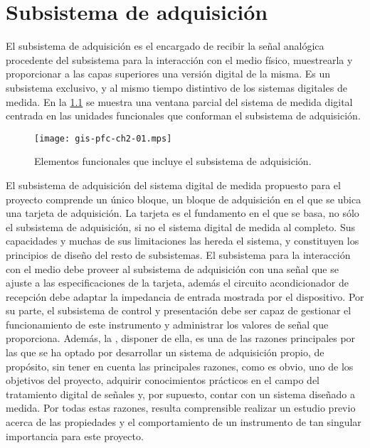 \chapter{Subsistema de adquisición}\label{chap:acquisition}

El subsistema de adquisición es el encargado de recibir la señal analógica
procedente del subsistema para la interacción con el medio físico,
muestrearla y proporcionar a las capas superiores una versión digital de la
misma. Es un subsistema exclusivo, y al mismo tiempo distintivo de los
sistemas digitales de medida. En la \cref{fig:subacqui} se muestra una
ventana parcial del sistema de medida digital centrada en las unidades
funcionales que conforman el subsistema de adquisición.

\begin{figure}
	\begin{center}
		\texttt{[image: gis-pfc-ch2-01.mps]}
	\end{center}
	\caption[Subsistema de adquisición] {Elementos funcionales que
	incluye el subsistema de adquisición.}
	\label{fig:subacqui}
\end{figure}

El subsistema de adquisición del sistema digital de medida propuesto para
el proyecto comprende un único bloque, un bloque de adquisición en el que
se ubica una tarjeta de adquisición. La tarjeta \kpci{} es el fundamento en
el que se basa, no sólo el subsistema de adquisición, si no el sistema
digital de medida al completo. Sus capacidades y muchas de sus limitaciones
las hereda el sistema, y constituyen los principios de diseño del resto de
subsistemas. El subsistema para la interacción con el medio debe proveer al
subsistema de adquisición con una señal que se ajuste a las
especificaciones de la tarjeta, además el circuito acondicionador de
recepción debe adaptar la impedancia de entrada mostrada por el
dispositivo. Por su parte, el subsistema de control y presentación debe ser
capaz de gestionar el funcionamiento de este instrumento y administrar los
valores de señal que proporciona. Además, la \kpci{}, disponer de ella, es
una de las razones principales por las que se ha optado por desarrollar un
sistema de adquisición propio, de propósito, sin tener en cuenta las
principales razones, como es obvio, uno de los objetivos del proyecto,
adquirir conocimientos prácticos en el campo del tratamiento digital de
señales y, por supuesto, contar con un sistema diseñado a medida. Por todas
estas razones, resulta comprensible realizar un estudio previo acerca de
las propiedades y el comportamiento de un instrumento de tan singular
importancia para este proyecto.

